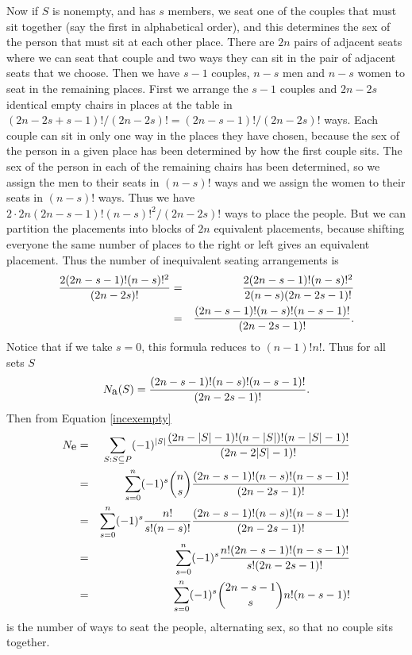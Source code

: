 {   Now if
$S$ is nonempty, and has $s$ members, we seat one of the couples that must
sit together (say the first in alphabetical order), and this determines the
sex of the person that must sit at each other place.  There are $2n$ pairs
of adjacent seats where we can seat that couple and two ways they can sit
in the pair of adjacent seats that we choose.  Then we have $s-1$ couples,
$n-s$ men and $n-s$ women to seat in the remaining places.  First we
arrange the $s-1$ couples and $2n-2s$ identical empty chairs in places at
the table in $(2n-2s+s-1)!/(2n-2s)!=(2n-s-1)!/(2n-2s)!$ ways.  Each couple
can sit in only one way in the places they have chosen, because the sex of
the person in a given place has been determined by how the first couple
sits.  The sex of the person in each of the remaining chairs has been
determined, so we assign the men to their seats in $(n-s)!$ ways and we
assign the women to their seats in $(n-s)!$ ways.  Thus we have
$2\cdot2n(2n-s-1)!(n-s)!^2/(2n-2s)!$ ways to place the people.  But we can
partition the placements into blocks of $2n$ equivalent placements,
because shifting everyone the same number of places to the right or left
gives an equivalent placement.  Thus the number of inequivalent seating
arrangements is
   \begin{eqnarray*}
{2(2n-s-1)!(n-s)!^2\over(2n-2s)!}&=&{2(2n-s-1)!(n-s)!^2\over
2(n-s)(2n-2s-1)!}\\&=&{(2n-s-1)!(n-s)!(n-s-1)!\over(2n-2s-1)!}.
    \end{eqnarray*}
 Notice that
if we take
$s=0$, this formula reduces to $(n-1)!n!$.  Thus for all sets $S$
$$N_{\mbox{a}}(S)={(2n-s-1)!(n-s)!(n-s-1)!\over(2n-2s-1)!}.$$
Then from Equation \ref{incexempty}
\begin{eqnarray*}
N_{\mbox{e}} &=& \sum_{S:S\subseteq P} (-1)^{|S|}{(2n-|S|-1)!(n-|S|)!(n-|S|-1)!
\over(2n-2|S|-1)!}\\
&=&\sum_{s=0}^n(-1)^s{n\choose s}{(2n-s-1)!(n-s)!(n-s-1)!\over(2n-2s-1)!}\\
&=&\sum_{s=0}^n(-1)^s{n!\over
s!(n-s)!}{(2n-s-1)!(n-s)!(n-s-1)!\over(2n-2s-1)!}\\
&=&\sum_{s=0}^n(-1)^s {n!(2n-s-1)!(n-s-1)!\over s!(2n-2s-1)!}\\
&=&\sum_{s=0}^n(-1)^s{2n-s-1\choose s}n!(n-s-1)!
\end{eqnarray*} is the number of ways to seat the people, alternating sex, so
that no couple sits together.}

\ep

